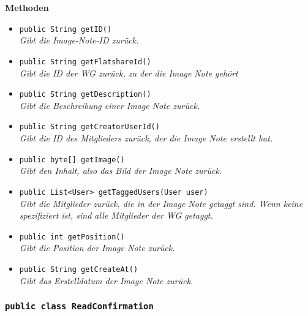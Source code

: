 	\textbf{Methoden}
	\begin{itemize}
		\item\texttt{{public String getID()}}\\
		\textit{Gibt die Image-Note-ID zurück.}\\
		
		\item\texttt{{public String getFlatshareId()}}\\
		\textit{Gibt die ID der WG zurück, zu der die Image Note gehört}\\
		
		\item\texttt{{public String getDescription()}}\\
		\textit{Gibt die Beschreibung einer Image Note zurück.}\\
		
		\item\texttt{{public String getCreatorUserId()}}\\
		\textit{Gibt die ID des Mitglieders zurück, der die Image Note erstellt hat.}\\
		
		\item\texttt{{public byte[] getImage()}}\\
		\textit{Gibt den Inhalt, also das Bild der Image Note zurück.}\\
		
		\item\texttt{{public List<User> getTaggedUsers(User user)}}\\
		\textit{Gibt die Mitglieder zurück, die in der Image Note getaggt sind. Wenn keine spezifiziert ist, sind alle Mitglieder der WG getaggt.}\\
		
		\item\texttt{{public int getPosition()}}\\
		\textit{Gibt die Position der Image Note zurück.}\\
		
		\item\texttt{{public String getCreateAt()}}\\
		\textit{Gibt das Erstelldatum der Image Note zurück.}\\
	\end{itemize}

\subsubsection{\texttt{public class ReadConfirmation}}

